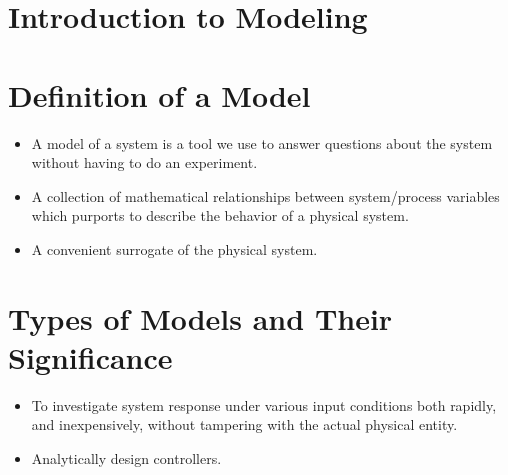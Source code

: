 \documentclass[../notes-main.tex]{subfiles}
\begin{document}
\section{Introduction to Modeling}
\begin{figure}[H]
    \centering
    \begin{mdframed}
        \begin{center}
        \end{center}
    \end{mdframed}
\vspace{-1em}\label{fig:label}
\end{figure}


\section{Definition of a Model}
\begin{itemize}
    \item A model of a system is a tool we use to answer questions about the system without having to do an experiment.
    \item A collection of mathematical relationships between system/process variables which purports to describe the behavior of a physical system.
    \item A convenient surrogate of the physical system.
\end{itemize}

\section{Types of Models and Their Significance}
\begin{itemize}
    \item To investigate system response under various input conditions both rapidly, and inexpensively, without tampering with the actual physical entity.
    \item Analytically design controllers.
\end{itemize}
\end{document}

